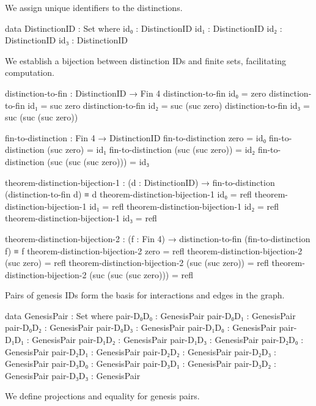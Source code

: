 \documentclass[11pt,a4paper]{book}
\begin{document}
We assign unique identifiers to the distinctions.

\begin{code}
data DistinctionID : Set where
  id₀ : DistinctionID
  id₁ : DistinctionID
  id₂ : DistinctionID
  id₃ : DistinctionID

\end{code}

We establish a bijection between distinction IDs and finite sets, facilitating computation.

\begin{code}
distinction-to-fin : DistinctionID → Fin 4
distinction-to-fin id₀ = zero
distinction-to-fin id₁ = suc zero
distinction-to-fin id₂ = suc (suc zero)
distinction-to-fin id₃ = suc (suc (suc zero))

fin-to-distinction : Fin 4 → DistinctionID
fin-to-distinction zero = id₀
fin-to-distinction (suc zero) = id₁
fin-to-distinction (suc (suc zero)) = id₂
fin-to-distinction (suc (suc (suc zero))) = id₃

theorem-distinction-bijection-1 : (d : DistinctionID) → fin-to-distinction (distinction-to-fin d) ≡ d
theorem-distinction-bijection-1 id₀ = refl
theorem-distinction-bijection-1 id₁ = refl
theorem-distinction-bijection-1 id₂ = refl
theorem-distinction-bijection-1 id₃ = refl

theorem-distinction-bijection-2 : (f : Fin 4) → distinction-to-fin (fin-to-distinction f) ≡ f
theorem-distinction-bijection-2 zero = refl
theorem-distinction-bijection-2 (suc zero) = refl
theorem-distinction-bijection-2 (suc (suc zero)) = refl
theorem-distinction-bijection-2 (suc (suc (suc zero))) = refl
\end{code}

Pairs of genesis IDs form the basis for interactions and edges in the graph.

\begin{code}
data GenesisPair : Set where
  pair-D₀D₀ : GenesisPair
  pair-D₀D₁ : GenesisPair
  pair-D₀D₂ : GenesisPair
  pair-D₀D₃ : GenesisPair
  pair-D₁D₀ : GenesisPair
  pair-D₁D₁ : GenesisPair
  pair-D₁D₂ : GenesisPair
  pair-D₁D₃ : GenesisPair
  pair-D₂D₀ : GenesisPair
  pair-D₂D₁ : GenesisPair
  pair-D₂D₂ : GenesisPair
  pair-D₂D₃ : GenesisPair
  pair-D₃D₀ : GenesisPair
  pair-D₃D₁ : GenesisPair
  pair-D₃D₂ : GenesisPair
  pair-D₃D₃ : GenesisPair
\end{code}

We define projections and equality for genesis pairs.
\end{document}
